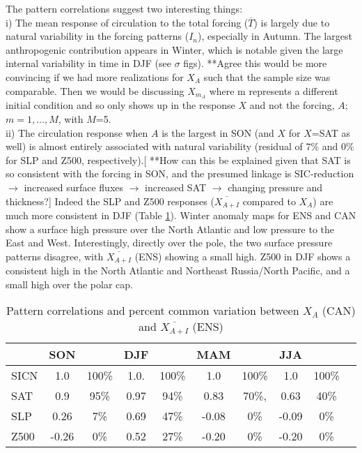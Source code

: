 \documentclass[12pt]{article}
\begin{document}
The pattern correlations suggest two interesting things:\\
i) The mean response of circulation to the total forcing ($\overline{T}$) is largely due to natural variability in the forcing patterns ($I_n$), especially in Autumn. The largest anthropogenic contribution appears in Winter, which is notable given the large internal variability in time in DJF (see $\sigma$ figs). **Agree this would be more convincing if we had more realizations for $X_A$ such that the sample size was comparable. Then we would be discussing $X_{m_A}$ where m represents a different initial condition and so only shows up in the response $X$ and not the forcing, $A$; $m=1,\ldots,M$, with $M$=5.\\
ii) The circulation response when $A$ is the largest in SON (and $X$ for $X$=SAT as well) is almost entirely associated with natural variability (residual of $7\%$ and $0\%$ for SLP and Z500, respectively).[ **How can this be explained given that SAT is so consistent with the forcing in SON, and the presumed linkage is SIC-reduction $\to$ increased surface fluxes $\to$ increased SAT $\to$ changing pressure and thickness?] Indeed the SLP and Z500 responses ($\overline{X_{A+I}}$ compared to $X_A$) are much more consistent in DJF (Table \ref{tbl:corrs}). Winter anomaly maps for ENS and CAN show a surface high pressure over the North Atlantic and low pressure to the East and West. Interestingly, directly over the pole, the two surface pressure patterns disagree, with $\overline{X_{A+I}}$ (ENS) showing a small high. Z500 in DJF shows a consistent high in the North Atlantic and Northeast Russia/North Pacific, and a small high over the polar cap.

\begin{table}[t]
\caption{Pattern correlations and percent common variation between $X_A$ (CAN) and $\overline{X_{A+I}}$ (ENS)}\label{tbl:corrs}
\begin{center}
\begin{tabular}{l|cc|cc|cc|ccc}
\hline\hline
           & SON      &                 & DJF &                & MAM &       & JJA &    \\
\hline
SICN & 1.0       &  100\%    & 1.0.    & 100\% & 1.0       &  100\% & 1.0    &  100\% \\
SAT  & 0.9        &  95\%        & 0.97    & 94\%   & 0.83    & 70\%,   &  0.63   &   40\%  \\
SLP &  0.26      &   7\%       & 0.69  &  47\%      & -0.08    & 0\%      &  -0.09  & 0\%   \\
Z500   & -0.26  & 0\%        & 0.52     & 27\%      &  -0.20  & 0\%      &  -0.20 & 0\% \\
\hline
\end{tabular}
\end{center}
\end{table}
\end{document}
